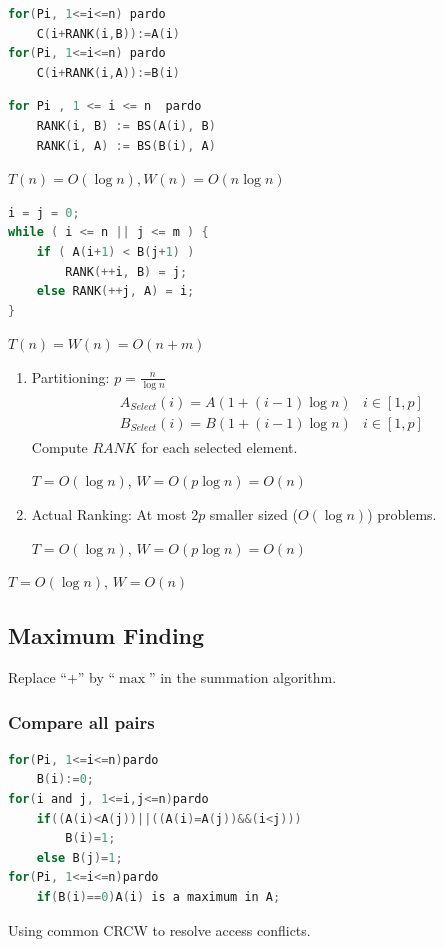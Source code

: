 \documentclass{article}
\begin{document}
\begin{lstlisting}[language={c}]
for(Pi, 1<=i<=n) pardo
    C(i+RANK(i,B)):=A(i)
for(Pi, 1<=i<=n) pardo
    C(i+RANK(i,A)):=B(i)
\end{lstlisting}

\begin{lstlisting}[language={c},caption={Binary Search}]
for Pi , 1 <= i <= n  pardo
    RANK(i, B) := BS(A(i), B)
    RANK(i, A) := BS(B(i), A)
\end{lstlisting}

$T(n) = O(\log n),W(n) = O(n\log n)$

\begin{lstlisting}[language={c},caption={Serial Ranking}]
i = j = 0; 
while ( i <= n || j <= m ) {
    if ( A(i+1) < B(j+1) )
        RANK(++i, B) = j;
    else RANK(++j, A) = i;
}
\end{lstlisting}

$T(n) = W(n) = O(n+m)$

\begin{enumerate}
    \item Partitioning: $p=\frac{n}{\log n}$
    \begin{align*}
        \begin{array}{ll}
            A_{Select}( i ) = A( 1+(i-1)\log n )&i \in [1, p]\\
            B_{Select}( i ) = B( 1+(i-1)\log n )&i \in [1, p]
        \end{array}
    \end{align*}
    Compute $RANK$ for each selected element. 

    $T=O(\log n)$, $W=O(p\log n)=O(n)$
    \item Actual Ranking: At most $2p$ smaller sized ($O(\log n)$) problems.

    $T=O(\log n)$, $W=O(p\log n)=O(n)$
\end{enumerate}
$T=O(\log n)$, $W=O(n)$

\subsection{Maximum Finding}
Replace ``$+$'' by ``$\max$'' in the summation algorithm. 

\subsubsection{Compare all pairs}
\begin{lstlisting}[language={c}]
for(Pi, 1<=i<=n)pardo
    B(i):=0;
for(i and j, 1<=i,j<=n)pardo
    if((A(i)<A(j))||((A(i)=A(j))&&(i<j)))
        B(i)=1;
    else B(j)=1;
for(Pi, 1<=i<=n)pardo
    if(B(i)==0)A(i) is a maximum in A;
\end{lstlisting}
Using common CRCW to resolve access conflicts. 
\end{document}
